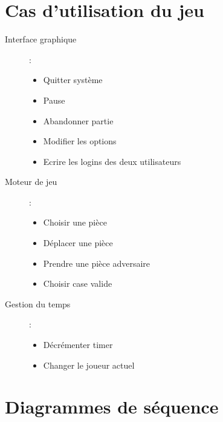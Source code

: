 \documentclass[11pt,a4paper]{report}
\begin{document}
\section*{Cas d'utilisation du jeu}
\begin{description}
    \item[Interface graphique ] :
  \begin{itemize}
      \item Quitter système
      \item Pause
      \item Abandonner partie
      \item Modifier les options
      \item Ecrire les logins des deux utilisateurs
  \end{itemize}

\item[Moteur de jeu] : 
\begin{itemize}
    \item Choisir une pièce
\item Déplacer une pièce
\item Prendre une pièce adversaire
\item Choisir case valide
\end{itemize}

\item[Gestion du temps] : 
\begin{itemize}
    \item Décrémenter timer
    \item Changer le joueur actuel
\end{itemize}
\end{description}

\section*{Diagrammes de séquence}

\clearpage
\end{document}
